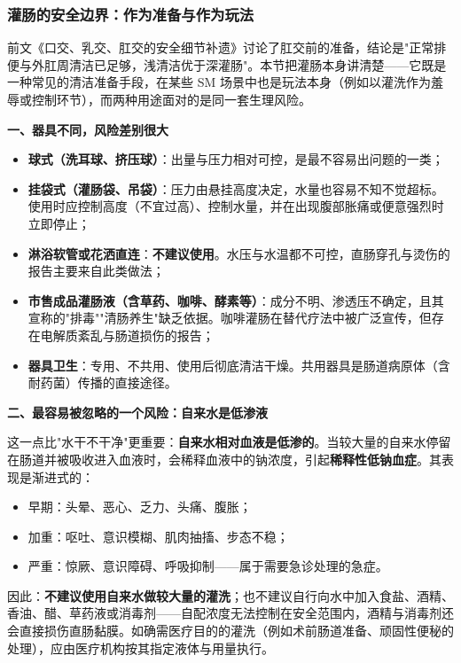 \subsubsection{灌肠的安全边界：作为准备与作为玩法}

前文《口交、乳交、肛交的安全细节补遗》讨论了肛交前的准备，结论是"正常排便与外肛周清洁已足够，浅清洁优于深灌肠"。本节把灌肠本身讲清楚——它既是一种常见的清洁准备手段，在某些 SM 场景中也是玩法本身（例如以灌洗作为羞辱或控制环节），而两种用途面对的是同一套生理风险。

\textbf{一、器具不同，风险差别很大}

\begin{itemize}
\item \textbf{球式（洗耳球、挤压球）}：出量与压力相对可控，是最不容易出问题的一类；
\item \textbf{挂袋式（灌肠袋、吊袋）}：压力由悬挂高度决定，水量也容易不知不觉超标。使用时应控制高度（不宜过高）、控制水量，并在出现腹部胀痛或便意强烈时立即停止；
\item \textbf{淋浴软管或花洒直连}：\textbf{不建议使用}。水压与水温都不可控，直肠穿孔与烫伤的报告主要来自此类做法；
\item \textbf{市售成品灌肠液（含草药、咖啡、酵素等）}：成分不明、渗透压不确定，且其宣称的"排毒""清肠养生"缺乏依据。咖啡灌肠在替代疗法中被广泛宣传，但存在电解质紊乱与肠道损伤的报告；
\item \textbf{器具卫生}：专用、不共用、使用后彻底清洁干燥。共用器具是肠道病原体（含耐药菌）传播的直接途径。
\end{itemize}

\textbf{二、最容易被忽略的一个风险：自来水是低渗液}

这一点比"水干不干净"更重要：\textbf{自来水相对血液是低渗的}。当较大量的自来水停留在肠道并被吸收进入血液时，会稀释血液中的钠浓度，引起\textbf{稀释性低钠血症}。其表现是渐进式的：

\begin{itemize}
\item 早期：头晕、恶心、乏力、头痛、腹胀；
\item 加重：呕吐、意识模糊、肌肉抽搐、步态不稳；
\item 严重：惊厥、意识障碍、呼吸抑制——属于需要急诊处理的急症。
\end{itemize}

因此：\textbf{不建议使用自来水做较大量的灌洗}；也不建议自行向水中加入食盐、酒精、香油、醋、草药液或消毒剂——自配浓度无法控制在安全范围内，酒精与消毒剂还会直接损伤直肠黏膜。如确需医疗目的的灌洗（例如术前肠道准备、顽固性便秘的处理），应由医疗机构按其指定液体与用量执行。

